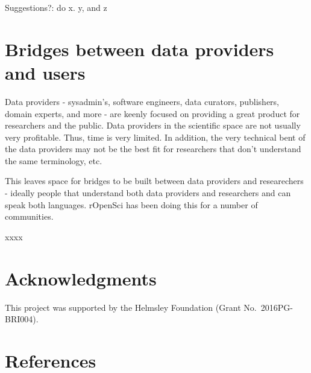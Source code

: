\documentclass[author-year, review, 11pt]{components/elsarticle} %
\begin{document}
Suggestions?: do x. y, and z

\hypertarget{bridges-between-data-providers-and-users}{%
\section{Bridges between data providers and
users}\label{bridges-between-data-providers-and-users}}

Data providers - sysadmin's, software engineers, data curators,
publishers, domain experts, and more - are keenly focused on providing a
great product for researchers and the public. Data providers in the
scientific space are not usually very profitable. Thus, time is very
limited. In addition, the very technical bent of the data providers may
not be the best fit for researchers that don't understand the same
terminology, etc.

This leaves space for bridges to be built between data providers and
researechers - ideally people that understand both data providers and
researchers and can speak both languages. rOpenSci has been doing this
for a number of communities.

xxxx

\hypertarget{acknowledgments}{%
\section{Acknowledgments}\label{acknowledgments}}

This project was supported by the Helmsley Foundation (Grant
No.~2016PG-BRI004).

\hypertarget{references}{%
\section{References}\label{references}}
\end{document}
